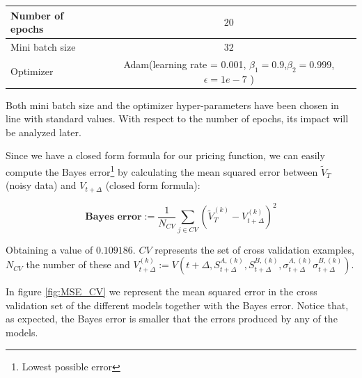 \begin{center}
\begin{tabular}{||l | c||} 
 \hline
 Number of epochs & $20$ \\
 \hline
 Mini batch size  & $32$  \\
 \hline
 Optimizer &  Adam(learning rate = 0.001, $\beta_1=0.9$,$\beta_2=0.999$,$\epsilon=1e-7$ ) \\
  \hline
 \end{tabular}
\end{center}
Both mini batch size and the optimizer hyper-parameters have been chosen in line with standard values. With respect to the number of epochs, its impact will be analyzed later. 


Since we have a closed form formula for our pricing function, we can easily compute the Bayes error\footnote{Lowest possible error} by calculating the mean squared error between $\tilde{V}_{T}$ (noisy data) and $V_{t+\Delta}$ (closed form formula):

$$\textbf{Bayes error}:=\frac{1}{N_{CV}}\sum_{j\in CV}\left(\tilde{V}_{T}^{(k)}-V_{t+\Delta}^{(k)}\right)^2$$

Obtaining a value of $0.109186$. $CV$ represents the set of cross validation examples, $N_{CV}$ the number of these and $V_{t+\Delta}^{(k)} := V\left(t+\Delta, S_{t+\Delta}^{A,(k)}
,S_{t+\Delta}^{B,(k)}
,\sigma_{t+\Delta}^{A,(k)}
\sigma_{t+\Delta}^{B,(k)}\right)$.

In figure \ref{fig:MSE_CV} we represent the mean squared error in the cross validation set of the different models together with the Bayes error. Notice that, as expected, the Bayes error is smaller that the errors produced by any of the models.

